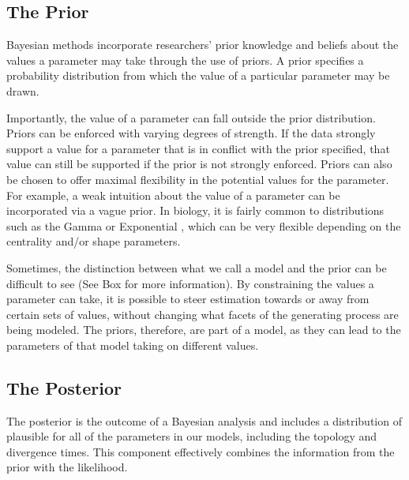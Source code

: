 \subsection{The Prior}


Bayesian methods incorporate researchers' prior knowledge and beliefs about the values a parameter may take through the use of priors.
A prior specifies a probability distribution from which the value of a particular parameter may be drawn.

Importantly, the value of a parameter can fall outside the prior distribution.
Priors can be enforced with varying degrees of strength.
If the data strongly support a value for a parameter that is in conflict with the prior specified, that value can still be supported if the prior is not strongly enforced.
Priors can also be chosen to offer maximal flexibility in the potential values for the parameter.
For example, a weak intuition about the value of a parameter can be incorporated via a vague prior.
In biology, it is fairly common to  distributions such as the Gamma or Exponential , which can be very flexible depending on the centrality and/or shape parameters.

Sometimes, the distinction between what we call a model and the prior can be difficult to see (See Box  for more information).
By constraining the values a parameter can take, it is possible to steer estimation towards or away from certain sets of values, without changing what facets of the generating process are being modeled. 
The priors, therefore, are part of a model, as they can lead to the parameters of that model taking on different values.

\subsection{The Posterior}

The posterior is the outcome of a Bayesian analysis and includes a distribution of plausible  for all of the  parameters  in our models, including the  topology and divergence times.
This component effectively combines the information from the prior with the likelihood. %

